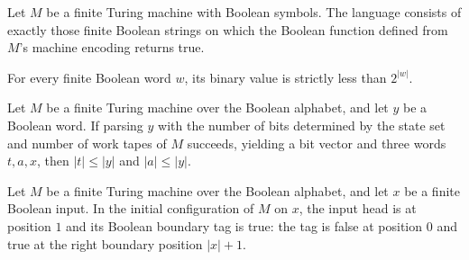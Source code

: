 \begin{definition}
\label{Complexity.Meyer.Tab}
\leanok
{}
Let $M$ be a finite Turing machine with Boolean symbols. The language consists of
exactly those finite Boolean strings on which the Boolean function defined from $M$’s
machine encoding returns true.
\end{definition}

\begin{theorem}
\label{Complexity.Meyer.ctrVal_lt}
\leanok
{}
For every finite Boolean word $w$, its binary value is strictly less than $2^{|w|}$.
\end{theorem}

\begin{theorem}
\label{Complexity.Meyer.parseQ_length}
\leanok
{}
Let $M$ be a finite Turing machine over the Boolean alphabet, and let $y$ be a Boolean
word. If parsing $y$ with the number of bits determined by the state set and number of
work tapes of $M$ succeeds, yielding a bit vector and three words $t,a,x$, then $|t|\le
|y|$ and $|a|\le |y|$.
\end{theorem}

\begin{theorem}
\label{Complexity.Meyer.init_tag}
\leanok
{}
Let $M$ be a finite Turing machine over the Boolean alphabet, and let $x$ be a finite
Boolean input. In the initial configuration of $M$ on $x$, the input head is at position
$1$ and its Boolean boundary tag is true: the tag is false at position $0$ and true at
the right boundary position $|x|+1$.
\end{theorem}

